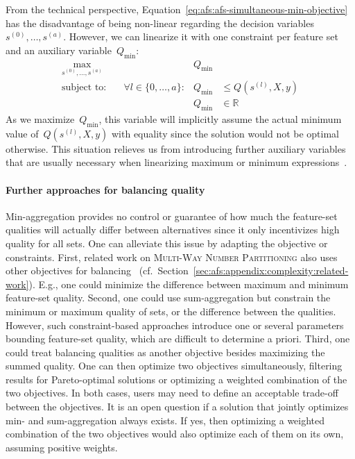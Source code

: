 \documentclass{article}
\theoremstyle{definition}
\begin{document}
From the technical perspective, Equation~\ref{eq:afs:afs-simultaneous-min-objective} has the disadvantage of being non-linear regarding the decision variables $s^{(0)}, \dots, s^{(a)}$.
However, we can linearize it with one constraint per feature set and an auxiliary variable~$Q_{\text{min}}$:
%
\begin{equation}
	\begin{aligned}
		\max_{s^{(0)}, \dots, s^{(a)}} &\quad &Q_{\text{min}} & \\
		\text{subject to:} &\quad \forall l \in \{0, \dots, a\}: &Q_{\text{min}} &\leq Q(s^{(l)},X,y) \\
		&\quad & Q_{\text{min}} &\in \mathbb{R}
	\end{aligned}
	\label{eq:afs:afs-simultaneous-min-objective-linear}
\end{equation}
%
As we maximize~$Q_{\text{min}}$, this variable will implicitly assume the actual minimum value of~$Q(s^{(l)},X,y)$ with equality since the solution would not be optimal otherwise.
This situation relieves us from introducing further auxiliary variables that are usually necessary when linearizing maximum or minimum expressions~\cite{mosek2022modeling}.

\paragraph{Further approaches for balancing quality}

Min-aggregation provides no control or guarantee of how much the feature-set qualities will actually differ between alternatives since it only incentivizes high quality for all sets.
One can alleviate this issue by adapting the objective or constraints.
First, related work on \textsc{Multi-Way Number Partitioning} also uses other objectives for balancing~\cite{korf2010objective, lawrinenko2017identical} (cf.~Section~\ref{sec:afs:appendix:complexity:related-work}).
E.g., one could minimize the difference between maximum and minimum feature-set quality.
Second, one could use sum-aggregation but constrain the minimum or maximum quality of sets, or the difference between the qualities.
However, such constraint-based approaches introduce one or several parameters bounding feature-set quality, which are difficult to determine a priori.
Third, one could treat balancing qualities as another objective besides maximizing the summed quality.
One can then optimize two objectives simultaneously, filtering results for Pareto-optimal solutions or optimizing a weighted combination of the two objectives.
In both cases, users may need to define an acceptable trade-off between the objectives.
It is an open question if a solution that jointly optimizes min- and sum-aggregation always exists.
If yes, then optimizing a weighted combination of the two objectives would also optimize each of them on its own, assuming positive weights.
\end{document}
